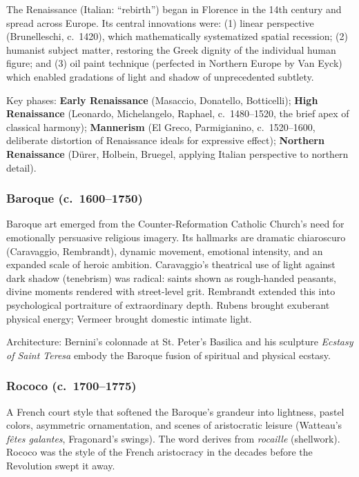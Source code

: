 \documentclass[11pt,letterpaper]{article}
\begin{document}
The Renaissance (Italian: ``rebirth'') began in Florence in the 14th century and spread across Europe. Its central innovations were: (1) linear perspective (Brunelleschi, c.~1420), which mathematically systematized spatial recession; (2) humanist subject matter, restoring the Greek dignity of the individual human figure; and (3) oil paint technique (perfected in Northern Europe by Van Eyck) which enabled gradations of light and shadow of unprecedented subtlety.

Key phases: \textbf{Early Renaissance} (Masaccio, Donatello, Botticelli); \textbf{High Renaissance} (Leonardo, Michelangelo, Raphael, c.~1480--1520, the brief apex of classical harmony); \textbf{Mannerism} (El Greco, Parmigianino, c.~1520--1600, deliberate distortion of Renaissance ideals for expressive effect); \textbf{Northern Renaissance} (D\"{u}rer, Holbein, Bruegel, applying Italian perspective to northern detail).

\subsubsection{Baroque (c.~1600--1750)}

Baroque art emerged from the Counter-Reformation Catholic Church's need for emotionally persuasive religious imagery. Its hallmarks are dramatic chiaroscuro (Caravaggio, Rembrandt), dynamic movement, emotional intensity, and an expanded scale of heroic ambition. Caravaggio's theatrical use of light against dark shadow (tenebrism) was radical: saints shown as rough-handed peasants, divine moments rendered with street-level grit. Rembrandt extended this into psychological portraiture of extraordinary depth. Rubens brought exuberant physical energy; Vermeer brought domestic intimate light.

Architecture: Bernini's colonnade at St. Peter's Basilica and his sculpture \emph{Ecstasy of Saint Teresa} embody the Baroque fusion of spiritual and physical ecstasy.

\subsubsection{Rococo (c.~1700--1775)}

A French court style that softened the Baroque's grandeur into lightness, pastel colors, asymmetric ornamentation, and scenes of aristocratic leisure (Watteau's \emph{fêtes galantes}, Fragonard's swings). The word derives from \emph{rocaille} (shellwork). Rococo was the style of the French aristocracy in the decades before the Revolution swept it away.
\end{document}
